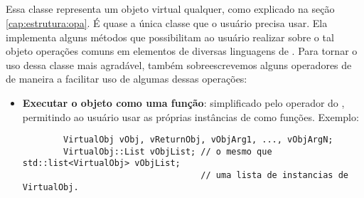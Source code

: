   \subsection{\VObj{}}
  \label{sec:atividades:opa:vobj}
  Essa classe representa um objeto virtual qualquer, como explicado na seção
  \ref{cap:estrutura:opa}. É quase a única classe que o
  usuário precisa usar. Ela implementa alguns métodos que possibilitam ao
  usuário realizar sobre o tal objeto operações comuns em elementos de diversas
  linguagens de \script{}. Para tornar o uso dessa classe mais agradável, também
  sobreescrevemos alguns operadores de \CXX{} de maneira a facilitar uso de
  algumas dessas operações:
  \begin{itemize}
    \item \textbf{Executar o objeto como uma função}: simplificado pelo operador \lang{()}
      do \CXX{}, permitindo ao usuário usar as próprias instâncias de \VObj{} como
      funções. Exemplo:
      \vspace{1em}
      \begin{lstlisting}
        VirtualObj vObj, vReturnObj, vObjArg1, ..., vObjArgN; 
        VirtualObj::List vObjList; // o mesmo que std::list<VirtualObj> vObjList;
                                   // uma lista de instancias de VirtualObj.
                                   

\end{lstlisting}
\end{itemize}
